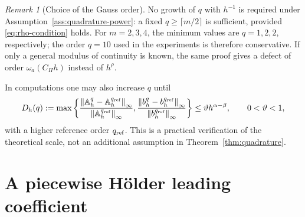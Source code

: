 \documentclass[11pt,a4paper]{amsart}
\theoremstyle{plain}
\theoremstyle{definition}
\theoremstyle{remark}
\newtheorem{remark}[theorem]{Remark}
\newcommand{\norm}[1]{\left\|#1\right\|}
\begin{document}
\begin{remark}[Choice of the Gauss order]\label{rem:q-choice}
No growth of $q$ with $h^{-1}$ is required under
Assumption~\ref{ass:quadrature-power}: a fixed
$q\ge\lceil m/2\rceil$ is sufficient, provided
\eqref{eq:rho-condition} holds.  For $m=2,3,4$, the minimum values are
$q=1,2,2$, respectively; the order $q=10$ used in the experiments is
therefore conservative.  If only a general modulus of continuity is known,
the same proof gives a defect of order $\omega_a(C_\Pi h)$ instead of
$h^\rho$.

In computations one may also increase $q$ until
\[
 D_h(q):=
 \max\left\{
 \frac{\norm{\mathbb A_h^q-\mathbb A_h^{q_{\rm ref}}}_\infty}
      {\norm{\mathbb A_h^{q_{\rm ref}}}_\infty},
 \frac{\norm{b_h^q-b_h^{q_{\rm ref}}}_\infty}
      {\norm{b_h^{q_{\rm ref}}}_\infty}
 \right\}
 \le
 \vartheta h^{\alpha-\beta},
 \qquad 0<\vartheta<1,
\]
with a higher reference order $q_{\rm ref}$.  This is a practical
verification of the theoretical scale, not an additional assumption in
Theorem~\ref{thm:quadrature}.
\end{remark}


\section{A piecewise H\"older leading coefficient}\label{sec:variablecoefficient}
\end{document}
